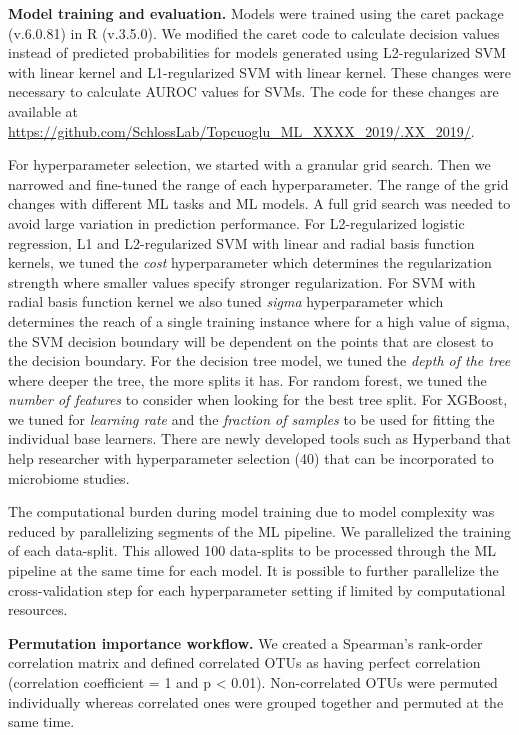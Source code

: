 \documentclass[11pt,]{article}
\begin{document}
\textbf{Model training and evaluation.} Models were trained using the
caret package (v.6.0.81) in R (v.3.5.0). We modified the caret code to
calculate decision values instead of predicted probabilities for models
generated using L2-regularized SVM with linear kernel and L1-regularized
SVM with linear kernel. These changes were necessary to calculate AUROC
values for SVMs. The code for these changes are available at
\url{https://github.com/SchlossLab/Topcuoglu_ML_XXXX_2019/.XX_2019/}.

For hyperparameter selection, we started with a granular grid search.
Then we narrowed and fine-tuned the range of each hyperparameter. The
range of the grid changes with different ML tasks and ML models. A full
grid search was needed to avoid large variation in prediction
performance. For L2-regularized logistic regression, L1 and
L2-regularized SVM with linear and radial basis function kernels, we
tuned the \emph{cost} hyperparameter which determines the regularization
strength where smaller values specify stronger regularization. For SVM
with radial basis function kernel we also tuned \emph{sigma}
hyperparameter which determines the reach of a single training instance
where for a high value of sigma, the SVM decision boundary will be
dependent on the points that are closest to the decision boundary. For
the decision tree model, we tuned the \emph{depth of the tree} where
deeper the tree, the more splits it has. For random forest, we tuned the
\emph{number of features} to consider when looking for the best tree
split. For XGBoost, we tuned for \emph{learning rate} and the
\emph{fraction of samples} to be used for fitting the individual base
learners. There are newly developed tools such as Hyperband that help
researcher with hyperparameter selection (40) that can be incorporated
to microbiome studies.

The computational burden during model training due to model complexity
was reduced by parallelizing segments of the ML pipeline. We
parallelized the training of each data-split. This allowed 100
data-splits to be processed through the ML pipeline at the same time for
each model. It is possible to further parallelize the cross-validation
step for each hyperparameter setting if limited by computational
resources.

\textbf{Permutation importance workflow.} We created a Spearman's
rank-order correlation matrix and defined correlated OTUs as having
perfect correlation (correlation coefficient = 1 and p \textless{}
0.01). Non-correlated OTUs were permuted individually whereas correlated
ones were grouped together and permuted at the same time.
\end{document}
